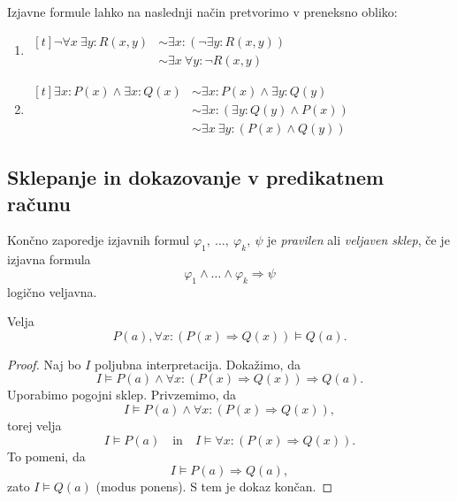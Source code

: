 \documentclass[12pt, a4paper]{article}
\renewcommand{\implies}{\Rightarrow}
\begin{document}
\begin{zgled}
Izjavne formule lahko na naslednji način pretvorimo v preneksno obliko:

\begin{enumerate}[label=\alph*)]
\item
$\begin{aligned}[t]
\neg\forall x~\exists y\colon R(x,y)
&\sim\exists x\colon(\neg\exists y\colon R(x,y))
\\
&\sim\exists x~\forall y\colon\neg R(x,y)
\end{aligned}$
\item
$\begin{aligned}[t]
\exists x\colon P(x)\land\exists x\colon Q(x)
&\sim\exists x\colon P(x)\land\exists y\colon Q(y)
\\
&\sim\exists x\colon(\exists y\colon Q(y)\land P(x))
\\
&\sim\exists x~\exists y\colon(P(x)\land Q(y))
\end{aligned}$
\end{enumerate}
\end{zgled}

\newpage

\subsection{Sklepanje in dokazovanje v predikatnem računu}

\begin{okvir}
\begin{definicija}
Končno zaporedje izjavnih formul $\varphi_1,~\dots,~\varphi_k,~\psi$ je \emph{pravilen} ali \emph{veljaven sklep}, če je izjavna formula
\[
\varphi_1\land\dots\land\varphi_k\implies\psi
\]
logično veljavna.
\end{definicija}
\end{okvir}

\begin{zgled}
Velja
\[
P(a),\forall x\colon(P(x)\implies Q(x))\models Q(a).
\]
\end{zgled}

\begin{proof}
Naj bo $I$ poljubna interpretacija. Dokažimo, da
\[
I\models P(a)\land\forall x\colon(P(x)\implies Q(x))\implies Q(a).
\]
Uporabimo pogojni sklep. Privzemimo, da
\[
I\models P(a)\land\forall x\colon(P(x)\implies Q(x)),
\]
torej velja
\[
I\models P(a)\quad\text{in}\quad I\models\forall x\colon(P(x)\implies Q(x)).
\]
To pomeni, da
\[
I\models P(a)\implies Q(a),
\]
zato $I\models Q(a)$ (modus ponens). S tem je dokaz končan.
\end{proof}
\end{document}
